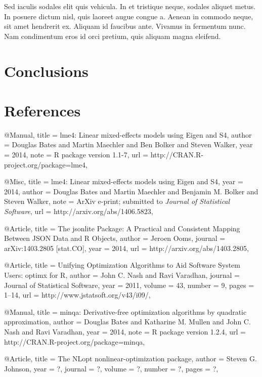 \documentclass[article]{jss}
\begin{document}
 Sed iaculis sodales elit quis vehicula. In et tristique neque, sodales aliquet metus. In posuere dictum nisl, quis laoreet augue congue a. Aenean in commodo neque, sit amet hendrerit ex. Aliquam id faucibus ante. Vivamus in fermentum nunc. Nam condimentum eros id orci pretium, quis aliquam magna eleifend. 

\section[Conclusions]{Conclusions}

\section[References]{References}

\begin{Schunk}
\begin{Soutput}
@Manual{,
  title = {{lme4}: Linear mixed-effects models using Eigen and S4},
  author = {Douglas Bates and Martin Maechler and Ben Bolker and Steven Walker},
  year = {2014},
  note = {R package version 1.1-7},
  url = {http://CRAN.R-project.org/package=lme4},
}

@Misc{,
  title = {{lme4}: Linear mixed-effects models using Eigen and S4},
  year = {2014},
  author = {Douglas Bates and Martin Maechler and Benjamin M. Bolker and Steven Walker},
  note = {ArXiv e-print; submitted to \emph{Journal of Statistical Software}},
  url = {http://arxiv.org/abs/1406.5823},
}
\end{Soutput}
\begin{Soutput}
@Article{,
  title = {The jsonlite Package: A Practical and Consistent Mapping Between JSON Data and R Objects},
  author = {Jeroen Ooms},
  journal = {arXiv:1403.2805 [stat.CO]},
  year = {2014},
  url = {http://arxiv.org/abs/1403.2805},
}
\end{Soutput}
\begin{Soutput}
@Article{,
  title = {Unifying Optimization Algorithms to Aid Software System Users: {optimx} for {R}},
  author = {John C. Nash and Ravi Varadhan},
  journal = {Journal of Statistical Software},
  year = {2011},
  volume = {43},
  number = {9},
  pages = {1--14},
  url = {http://www.jstatsoft.org/v43/i09/},
}
\end{Soutput}
\begin{Soutput}
@Manual{,
  title = {minqa: Derivative-free optimization algorithms by quadratic
approximation},
  author = {Douglas Bates and Katharine M. Mullen and John C. Nash and Ravi Varadhan},
  year = {2014},
  note = {R package version 1.2.4},
  url = {http://CRAN.R-project.org/package=minqa},
}
\end{Soutput}
\begin{Soutput}
@Article{,
  title = {The NLopt nonlinear-optimization package},
  author = {Steven G. Johnson},
  year = {?},
  journal = {?},
  volume = {?},
  number = {?},
  pages = {?},
}
\end{Soutput}
\end{Schunk}
\end{document}
